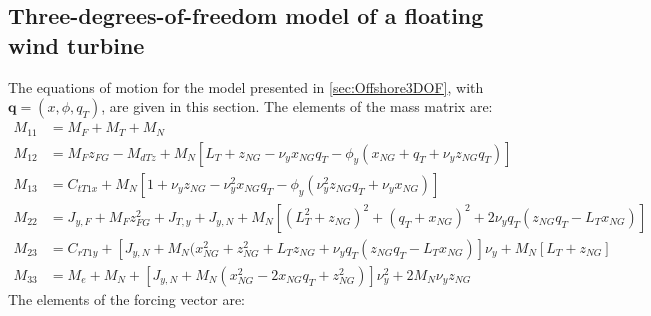 \documentclass[wes, manuscript]{copernicus}
\renewcommand{\v}[1]{\boldsymbol{#1}}
\begin{document}
\subsection{Three-degrees-of-freedom model of a floating wind turbine}
\label{sec:Offshore3DOFEq}
The equations of motion for the model presented in \autoref{sec:Offshore3DOF}, with $\v{q}=(x,\phi,q_T)$, are given in this section.
The elements of the mass matrix are:
\begin{align}
M_{11} &=M_F + M_T + M_N  
    \\
M_{12} &=  M_{F} z_{FG} - M_{d T z}+ M_N \left[L_T +  z_{NG} - \nu_y x_{NG} q_T -  \phi_y(x_{NG}  +  q_T +   \nu_y z_{NG} q_T ) \right]
\\
M_{13} &=C_{t T 1x} + M_N \left[1 +  \nu_y z_{NG} - \nu_y^{2} x_{NG} q_T - \phi_y (\nu_y^{2} z_{NG}  q_T + \nu_y x_{NG} ) \right]
\\
M_{22} &=
 J_{y,F} + M_F z_{FG}^{2} + J_{T,y} + J_{y,N}
+ M_N\left[ (L_T^2 +z_{NG})^2 + (q_T + x_{NG})^2  + 2 \nu_y q_T(z_{NG} q_T-  L_T x_{NG}) \right] \\
M_{23}&=
C_{r T 1y} + \left[J_{y,N}+M_N(x_{NG}^{2} + z_{NG}^{2} + L_T z_{NG} + \nu_y  q_T(z_{NG} q_T -L_T x_{NG})\right] \nu_y  + M_N\left[L_T + z_{NG}\right]
\\
M_{33} &= M_e + M_N 
+\left[ J_{y,N} + M_N \left(x_{NG}^2 - 2 x_{NG} q_T + z_{NG}^2\right) \right]\nu_y^{2} + 2 M_N \nu_y z_{NG} 
\end{align}
The elements of the forcing vector are:
\end{document}
